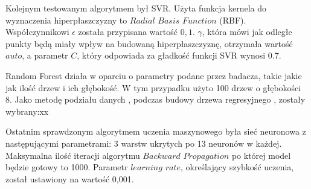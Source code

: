 Kolejnym testowanym algorytmem był SVR. Użyta funkcja kernela do wyznaczenia hiperpłaszczyzny to $Radial$ $Basis$ $Function$ (RBF). Współczynnikowi $\epsilon$ została przypisana wartość $0,1$. $\gamma$, która mówi jak odległe punkty będą miały wpływ na budowaną hiperpłaszczyznę, otrzymała wartość $auto$, a parametr $C$, który odpowiada za gładkość funkcji SVR wynosi 0.7.\par

Random Forest działa w oparciu o parametry podane przez badacza, takie jakie jak ilość drzew i ich głębokość. W tym przypadku użyto 100 drzew o głębokości 8. Jako metodę podziału danych , podczas budowy drzewa regresyjnego , zostały wybrany:xx\par

Ostatnim sprawdzonym algorytmem uczenia maszynowego była sieć neuronowa z następującymi parametrami: 3 warstw ukrytych po 13 neuronów w każdej. Maksymalna ilość iteracji algorytmu $Backward$ $Propagation$ po której model będzie gotowy to 1000. Parametr $learning$ $rate$, określający szybkość uczenia, został ustawiony na wartość 0,001.\par

